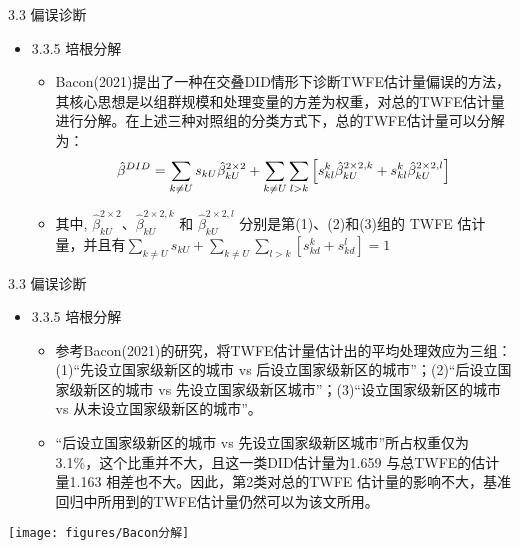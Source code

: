 \documentclass{beamer}%
\begin{document}
\begin{frame}[t]{\large 3.3 偏误诊断}
\begin{itemize}
  \item 3.3.5 培根分解
  \begin{itemize}
  \item Bacon(2021)提出了一种在交叠DID情形下诊断TWFE估计量偏误的方法，其核心思想是以组群规模和处理变量的方差为权重，对总的TWFE估计量进行分解。在上述三种对照组的分类方式下，总的TWFE估计量可以分解为：
    \begin{equation}
    \setlength{\abovedisplayskip}{2pt}
    \setlength{\belowdisplayskip}{2pt}
    \hat{\beta}^{D I D}=\sum_{k \neq U} s_{k U} \hat{\beta}_{k U}^{2 \times 2}+\sum_{k \neq U} \sum_{l>k}\left[s_{k l}^k \hat{\beta}_{k U}^{2 \times 2, k}+s_{k l}^k \hat{\beta}_{k U}^{2 \times 2, l}\right]
    \end{equation}
  \item 其中, $\hat{\beta}_{k U}^{2 \times 2} 、 \hat{\beta}_{k U}^{2 \times 2, k}$ 和 $\hat{\beta}_{k U}^{2 \times 2, l}$ 分别是第(1)、(2)和(3)组的 TWFE 估计量，并且有$\sum_{k \neq U} s_{k U}+\sum_{k \neq U} \sum_{l>k}\left[s_{k d}^k+s_{k d}^l\right]=1$
  \end{itemize}
\end{itemize}
\end{frame}


\begin{frame}[t]{\large 3.3 偏误诊断}
\begin{itemize}
  \item 3.3.5 培根分解
  \begin{itemize}
  \item 参考Bacon(2021)的研究，将TWFE估计量估计出的平均处理效应为三组：(1)“先设立国家级新区的城市 vs 后设立国家级新区的城市”；(2)“后设立国家级新区的城市 vs 先设立国家级新区城市”；(3)“设立国家级新区的城市 vs 从未设立国家级新区的城市”。
  \item “后设立国家级新区的城市 vs 先设立国家级新区城市”所占权重仅为3.1\%，这个比重并不大，且这一类DID估计量为1.659 与总TWFE的估计量1.163 相差也不大。因此，第2类对总的TWFE 估计量的影响不大，基准回归中所用到的TWFE估计量仍然可以为该文所用。
  \end{itemize}
\end{itemize}
\vspace{-0.4cm} %
\begin{center}
	\texttt{[image: figures/Bacon分解]}
\end{center}
\end{frame}
\end{document}
